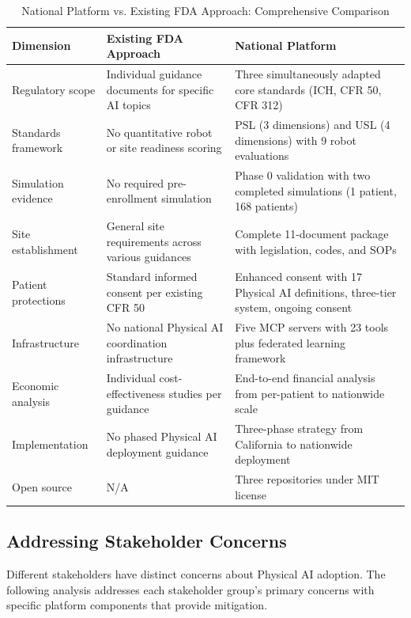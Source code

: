 \begin{table}[H]
\centering
\caption{National Platform vs. Existing FDA Approach: Comprehensive Comparison}
\label{tab:platform-vs-fda}
\small
\begin{tabularx}{\textwidth}{l X X}
\toprule
\textbf{Dimension} & \textbf{Existing FDA Approach} & \textbf{National Platform} \\
\midrule
Regulatory scope & Individual guidance documents for specific AI topics & Three simultaneously adapted core standards (ICH, CFR 50, CFR 312) \\
Standards framework & No quantitative robot or site readiness scoring & PSL (3 dimensions) and USL (4 dimensions) with 9 robot evaluations \\
Simulation evidence & No required pre-enrollment simulation & Phase 0 validation with two completed simulations (1 patient, 168 patients) \\
Site establishment & General site requirements across various guidances & Complete 11-document package with legislation, codes, and SOPs \\
Patient protections & Standard informed consent per existing CFR 50 & Enhanced consent with 17 Physical AI definitions, three-tier system, ongoing consent \\
Infrastructure & No national Physical AI coordination infrastructure & Five MCP servers with 23 tools plus federated learning framework \\
Economic analysis & Individual cost-effectiveness studies per guidance & End-to-end financial analysis from per-patient to nationwide scale \\
Implementation & No phased Physical AI deployment guidance & Three-phase strategy from California to nationwide deployment \\
Open source & N/A & Three repositories under MIT license \\
\bottomrule
\end{tabularx}
\end{table}

\subsection{Addressing Stakeholder Concerns}
\label{subsec:discuss-stakeholder-concerns}

Different stakeholders have distinct concerns about Physical AI adoption. The
following analysis addresses each stakeholder group's primary concerns with
specific platform components that provide mitigation.

